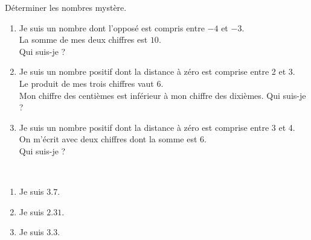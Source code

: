 \begin{exercice}
   Déterminer les nombres mystère.
   \begin{enumerate}      
         \item Je suis un nombre dont l'opposé est compris entre $-4$ et $-3$.\\
      La somme de mes deux chiffres est $10$.\\
      Qui suis-je ?
         \item Je suis un nombre positif dont la distance à zéro est comprise entre 2 et 3.\\
      Le produit de mes trois chiffres vaut 6.\\
      Mon chiffre des centièmes est inférieur à mon chiffre des dixièmes. Qui suis-je ?
         \item Je suis un nombre positif dont la distance à zéro est comprise entre 3 et 4.\\
      On m'écrit avec deux chiffres dont la somme est 6.\\
      Qui suis-je ?      
      \end{enumerate}
 \end{exercice}
 
 \begin{corrige}
    \ \\ [-5mm]
    \begin{enumerate}
      \item Je suis $\num{3.7}$.
      \item Je suis $\num{2.31}$.
      \item Je suis $\num{3.3}$.
   \end{enumerate}
 \end{corrige}